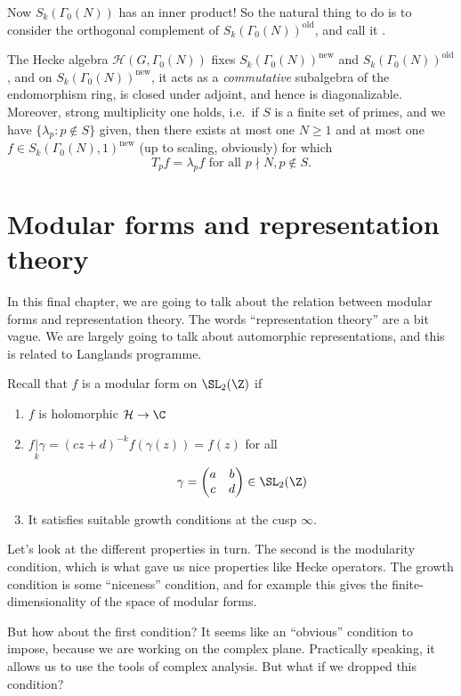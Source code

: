 \documentclass[a4paper]{article}
\renewcommand{\H}{\mathcal{H}}
\begin{document}
Now $S_k(\Gamma_0(N))$ has an inner product! So the natural thing to do is to consider the orthogonal complement of $S_k(\Gamma_0(N))^{\mathrm{old}}$, and call it .

\begin{thm}
  The Hecke algebra $\mathcal{H}(G, \Gamma_0(N))$ fixes $S_k(\Gamma_0(N))^{\mathrm{new}}$ and $S_k(\Gamma_0(N))^{\mathrm{old}}$, and on $S_k(\Gamma_0(N))^{\mathrm{new}}$, it acts as a \emph{commutative} subalgebra of the endomorphism ring, is closed under adjoint, and hence is diagonalizable. Moreover, strong multiplicity one holds, i.e.\ if $S$ is a finite set of primes, and we have $\{\lambda_p: p \not\in S\}$ given, then there exists at most one $N \geq 1$ and at most one $f \in S_k(\Gamma_0(N), 1)^{\mathrm{new}}$ (up to scaling, obviously) for which
  \[
    T_p f = \lambda_p f\text{ for all }p \nmid N, p \not \in S.
  \]
\end{thm}

\section{Modular forms and representation theory}
In this final chapter, we are going to talk about the relation between modular forms and representation theory. The words ``representation theory'' are a bit vague. We are largely going to talk about automorphic representations, and this is related to Langlands programme.

Recall that $f$ is a modular form on $\SL_2(\Z)$ if
\begin{enumerate}
  \item $f$ is holomorphic $\H \to \C$
  \item $f\underset{k}{|} \gamma = (cz + d)^{-k} f(\gamma(z)) = f(z)$ for all
    \[
      \gamma =
      \begin{pmatrix}
        a & b\\
        c & d
      \end{pmatrix} \in \SL_2(\Z)
    \]
  \item It satisfies suitable growth conditions at the cusp $\infty$.
\end{enumerate}
Let's look at the different properties in turn. The second is the modularity condition, which is what gave us nice properties like Hecke operators. The growth condition is some ``niceness'' condition, and for example this gives the finite-dimensionality of the space of modular forms.

But how about the first condition? It seems like an ``obvious'' condition to impose, because we are working on the complex plane. Practically speaking, it allows us to use the tools of complex analysis. But what if we dropped this condition?
\end{document}
